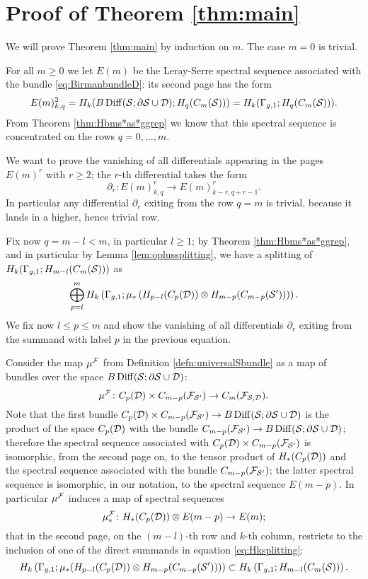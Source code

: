\section{Proof of Theorem \ref{thm:main}}
We will prove Theorem \ref{thm:main} by induction on $m$.
The case $m=0$ is trivial.

For all $m\geq 0$ we let $E(m)$ be the Leray-Serre spectral sequence associated with
the bundle \eqref{eq:BirmanbundleD}: its second page has the form
\[
 E(m)^2_{k,q}=H_k(B\operatorname{Diff}(\mathcal{S};\partial\mathcal{S}\cup\mathcal{D});H_q(C_m(\mathcal{S})))=H_k(\Gamma_{g,1};H_q(C_m(\mathcal{S}))).
\]
From Theorem \ref{thm:Hbms*as*ggrep} we know that this spectral sequence is concentrated
on the rows $q=0,\dots, m$.

We want to prove the vanishing of all differentials appearing in the pages
$E(m)^r$ with $r\geq 2$; the $r$-th differential takes the form
\[
 \partial_r\colon E(m)^r_{k,q}\to E(m)^r_{k-r,q+r-1}.
\]
In particular any differential $\partial_r$ exiting from the row $q=m$ is trivial,
because it lands in a higher, hence trivial row.

Fix now $q=m-l<m$, in particular $l\geq 1$; by Theorem \ref{thm:Hbms*as*ggrep}, and
in particular by Lemma \ref{lem:oplussplitting}, we have a splitting of $H_k(\Gamma_{g,1};H_{m-l}(C_m(\mathcal{S})))$ as
\begin{equation}
\label{eq:Hksplitting}
 \bigoplus_{p=l}^m H_k\left(\Gamma_{g,1};\mu_*\left(H_{p-l}(C_p(\mathcal{D}))\otimes H_{m-p}(C_{m-p}(\mathcal{S}'))\right)\right).
\end{equation} 
We fix now $l\leq p\leq m$ and show the vanishing of all differentials $\partial_r$ exiting from the
summand with label $p$ in the previous equation.

Consider the map $\mu^{\mathcal{F}}$ from Definition \ref{defn:universalSbundle} as a map of
bundles over the space $B\operatorname{Diff}(\mathcal{S};\partial\mathcal{S}\cup\mathcal{D})$:
\[
 \mu^{\mathcal{F}}\colon C_p(\mathcal{D})\times C_{m-p}(\mathcal{F}_{\mathcal{S}'})\to C_m(\mathcal{F}_{\mathcal{S},\mathcal{D}}).
\]
Note that the first bundle $C_p(\mathcal{D})\times C_{m-p}(\mathcal{F}_{\mathcal{S}'})\to B\operatorname{Diff}(\mathcal{S};\partial\mathcal{S}\cup\mathcal{D})$
is the product of the space $C_p(\mathcal{D})$ with the bundle $C_{m-p}(\mathcal{F}_{\mathcal{S}'})\to B\operatorname{Diff}(\mathcal{S};\partial\mathcal{S}\cup\mathcal{D})$;
therefore the spectral sequence associated with $C_p(\mathcal{D})\times C_{m-p}(\mathcal{F}_{\mathcal{S}'})$ is isomorphic,
from the second page on, to the tensor product
of $H_*(C_p(\mathcal{D}))$ and the spectral sequence associated with the bundle $C_{m-p}(\mathcal{F}_{\mathcal{S}'})$; the
latter spectral sequence is isomorphic, in our notation, to the spectral sequence $E(m-p)$.
In particular $\mu^{\mathcal{F}}$ induces a map of spectral
sequences
\[
\mu^{\mathcal{F}}_*\colon H_*(C_p(\mathcal{D}))\otimes E(m-p)\to E(m);
\]
that in the second page, on the $(m-l)$-th row and $k$-th column, restricts to
the inclusion of one of the direct summands in equation \eqref{eq:Hksplitting}:
\[
H_k\left(\Gamma_{g,1};\mu_*(H_{p-l}(C_p(\mathcal{D}))\otimes H_{m-p}(C_{m-p}(\mathcal{S}')))\right)\subset H_k\left(\Gamma_{g,1};H_{m-l}(C_m(\mathcal{S}))\right).
\]

